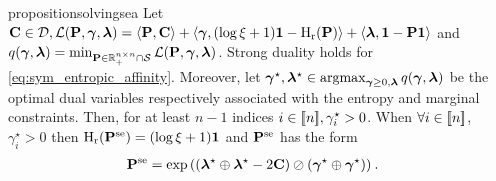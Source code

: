 \begin{restatable}{proposition}{solvingsea}
\label{prop:sol_gamma_non_null}
Let $\mathbf{C} \in \mathcal{D}, \mathcal{L}(\mathbf{P}, \bm{\gamma}, \bm{\lambda})= \langle \mathbf{P}, \mathbf{C} \rangle + \langle \boldsymbol{\gamma}, (\log{\xi} + 1) \bm{1} - \operatorname{H}_{\mathrm{r}}(\mathbf{P}) \rangle + \langle \boldsymbol{\lambda}, \bm{1} - \mathbf{P} \bm{1} \rangle$ and $q(\bm{\gamma}, \bm{\lambda}) = \min_{\mathbf{P} \in \mathbb{R}_{+}^{n \times n} \cap \mathcal{S}} \mathcal{L}(\mathbf{P}, \bm{\gamma}, \bm{\lambda})$. Strong duality holds for \eqref{eq:sym_entropic_affinity}. Moreover, let
$\bm{\gamma}^\star, \boldsymbol{\lambda}^\star \in \operatorname{argmax}_{\bm{\gamma} \geq 0, \boldsymbol{\lambda}} q(\bm{\gamma}, \bm{\lambda})$ be the optimal dual variables respectively associated with the entropy and marginal constraints. Then, for at least $n-1$ indices $i \in {[\![n]\!]}, \gamma^{\star}_i > 0$.
When $\forall i \in {[\![n]\!]}$, $\gamma^\star_i > 0$ then $\operatorname{H}_{\mathrm{r}}(\mathbf{P}^{\mathrm{se}}) = (\log \xi + 1)\bm{1}$ and $\mathbf{P}^{\mathrm{se}}$ has the form
\begin{align}
    \mathbf{P}^{\mathrm{se}} &= \exp{\left(\left(\boldsymbol{\lambda}^\star \oplus \boldsymbol{\lambda}^\star - 2 \mathbf{C}\right) \oslash \left(\bm{\gamma}^\star \oplus \bm{\gamma}^\star \right) \right)} \:.
\end{align}
\end{restatable}
